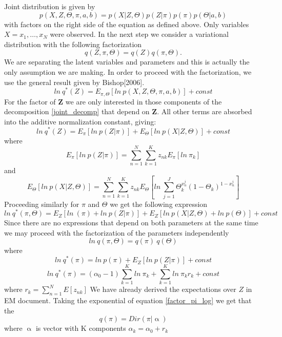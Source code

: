 \documentclass{article}
\newcommand\JointProb{p(X,Z,\Theta,\pi,a,b)}
\newcommand\ProbSingleCoin{\Theta_k^{x_n^j}(1-\Theta_k)^{1-x_n^j}}
\newcommand\SumK{\sum_{k=1}^{K}}
\newcommand\SumN{\sum_{n=1}^{N}}
\newcommand\SumJ{\sum_{j=1}^{J}}
\begin{document}
Joint distribution is given by
\begin{equation}\label{joint_decomp}
    \JointProb{} = p(X|Z,\Theta)p(Z|\pi)p(\pi)p(\Theta|a,b)
\end{equation}
with factors on the right side of the equation as defined above. Only variables $X={x_1,\dots,x_N}$ were observed. In the next step we consider a variational distribution with the following factorization
\begin{equation}\label{factor_decomp1}
q(Z, \pi, \Theta) = q(Z)q(\pi,\Theta).
\end{equation}
We are separating the latent variables and parameters and this is actually the only assumption we are making.
In order to proceed with the factorization, we use the general result given by Bishop[2006].
\begin{equation}
    ln\: q^*(Z)=E_{\pi,\Theta}[ln\:\JointProb] + const
\end{equation}
For the factor of \textbf{Z} we are only interested in those components of the decomposition \ref{joint_decomp} that depend on \textbf{Z}. All other terms are absorbed into the additive normalization constant, giving:
\begin{equation}
    ln\: q^*(Z)=E_{\pi}[ln\:p(Z|\pi)] + E_\Theta[ln\:p(X|Z,\Theta)] + const
\end{equation}
where
\begin{equation}
    E_{\pi}[ln\:p(Z|\pi)]  = \SumN\SumK z_{nk}E_\pi[ln\:\pi_k]
\end{equation}
and
\begin{equation}
    E_\Theta[ln\:p(X|Z,\Theta)] = \SumN\SumK z_{nk}E_\Theta[ln\:\SumJ{\ProbSingleCoin}]
\end{equation}
Proceeding similarly for \textbf{$\pi$} and \textbf{$\Theta$} we get the following expression
\begin{equation}
    ln\: q^*(\pi,\Theta)=E_{Z}[ln\:(\pi) + ln\:p(Z|\pi)] + E_Z[ln\:p(X|Z,\Theta) + ln\:p(\Theta)] + const
\end{equation}
Since there are no expressions that depend on both parameters at the same time we may proceed with the factorization of the parameters independently
\begin{equation}\label{factor_decomp2}
    ln\:q(\pi,\Theta) = q(\pi)\:q(\Theta)
\end{equation}
where
\begin{equation}
    ln\:q^*(\pi) = ln\:p(\pi) + E_{Z}[ln\:p(Z|\pi)] + const
\end{equation}
\begin{equation}\label{factor_pi_log}
    ln\:q^*(\pi) = (\alpha_0-1)\SumK{ln\:\pi_k} + \SumK ln\:\pi_k r_k + const
\end{equation}
where $r_{k} = \SumN E[z_{nk}]$
We have already derived the expectations over $Z$ in EM document.
Taking the exponential of equation \ref{factor_pi_log} we get that the 
\begin{equation}
    q(\pi) = Dir(\pi| \upalpha)
\end{equation}
where $\upalpha$ is vector with K components $\alpha_k = \alpha_0+r_k$
\end{document}

